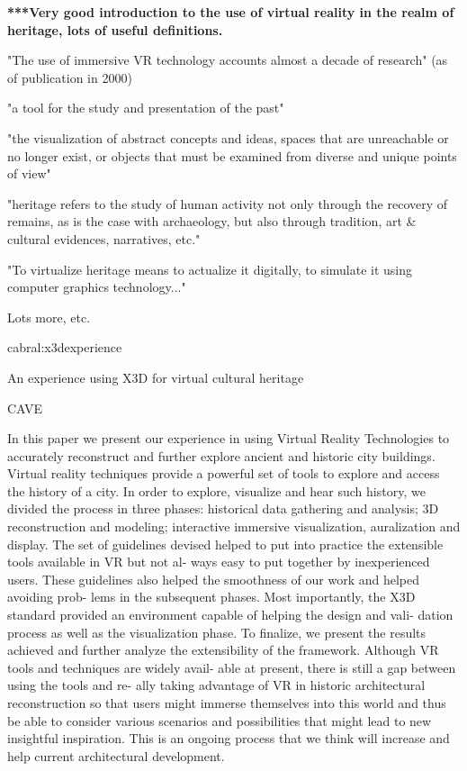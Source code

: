 \textbf{***Very good introduction to the use of virtual reality in the realm of heritage, lots of useful definitions.}
        
"The use of immersive VR technology accounts almost a decade of research" (as of publication in 2000)
        
"a tool for the study and presentation of the past"
        
"the visualization of abstract concepts and ideas, spaces that are unreachable or no longer exist, or objects
that must be examined from diverse and unique points of view"
        
"heritage refers to the study of human activity not only through the recovery of remains, as is the case
with archaeology, but also through tradition, art \& cultural evidences, narratives, etc."
        
"To virtualize heritage means to actualize it digitally, to simulate it using computer graphics technology..."
        
Lots more, etc.


cabral:x3dexperience

An experience using X3D for virtual cultural heritage

CAVE

In this paper we present our experience in using Virtual Reality
Technologies to accurately reconstruct and further explore ancient
and historic city buildings. Virtual reality techniques provide a
powerful set of tools to explore and access the history of a city.
In order to explore, visualize and hear such history, we divided the
process in three phases: historical data gathering and analysis; 3D
reconstruction and modeling; interactive immersive visualization,
auralization and display. The set of guidelines devised helped to
put into practice the extensible tools available in VR but not al-
ways easy to put together by inexperienced users. These guidelines
also helped the smoothness of our work and helped avoiding prob-
lems in the subsequent phases. Most importantly, the X3D standard
provided an environment capable of helping the design and vali-
dation process as well as the visualization phase. To finalize, we
present the results achieved and further analyze the extensibility of
the framework. Although VR tools and techniques are widely avail-
able at present, there is still a gap between using the tools and re-
ally taking advantage of VR in historic architectural reconstruction
so that users might immerse themselves into this world and thus be
able to consider various scenarios and possibilities that might lead
to new insightful inspiration. This is an ongoing process that we
think will increase and help current architectural development.

